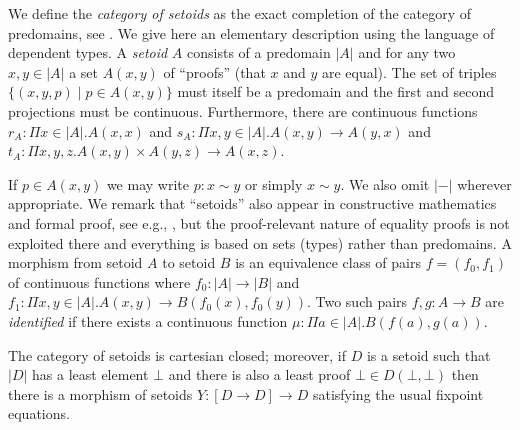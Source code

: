 \documentclass[orivec]{llncs}
\makeatletter
\newif\iffull\fullfalse
\renewcommand{\section}{\@startsection{section}{1}{\z@}{-10\p@ \@plus -4\p@ \@minus -4\p@}{5\p@ \@plus 4\p@ \@minus 4\p@}{\normalfont\bfseries\boldmath\rightskip=\z@ \@plus 8em\pretolerance=10000 }}
\makeatother
\begin{document}
\section{Setoids}
\label{sec:setoids}
We define the \emph{category of setoids} as the exact completion of
the category of predomains, see
\cite{DBLP:conf/mfps/CarboniFS87,DBLP:conf/lics/BirkedalCRS98}. We
give here an elementary description using the language of dependent
types.  A \emph{setoid} $A$ consists of a predomain $|A|$ and for any
two $x,y\in |A|$ a set $A(x,y)$ of ``proofs'' (that $x$ and $y$ are
equal). The set of triples $\{(x,y,p) \mid p\in A(x,y)\}$ must itself
be a predomain and the first and second projections must be
continuous. Furthermore, there are continuous functions $r_A:\Pi x\in
|A|.A(x,x)$ and $s_A:\Pi x,y\in |A|.A(x,y)\rightarrow A(y,x)$ and
$t_A:\Pi x,y,z.A(x,y)\times A(y,z)\rightarrow A(x,z)$.
\iffull
We should explain what continuity of a dependent function like
$t(-,-)$ is: if $(x_i)_i$ and $(y_i)_i$ and $(z_i)_i$ are ascending
chains in $A$ with suprema $x,y,z$ and $p_i\in A(x_i,y_i)$ and $q_i\in
A(y_i,z_i)$ are proofs such that $(x_i,y_i,p_i)_i$ and $(y_i,z_i,q_i)_i$
are ascending chains, too, with suprema $(x,y,p)$ and $(y,z,q)$ then
$(x_i,z_i,t(p_i,q_i))$ is an ascending chain of proofs (by
monotonicity of $t(-,-)$) and its supremum is $(x,z,t(p,q))$.
\fi
\iffull
 Formally,
such dependent functions can be reduced to non-dependent ones using
pullbacks, that is $t$ would be a function defined on the pullback of
the second and first projections from $\{(x,y,p)\mid p\in A(x,y)\}$ to
$|A|$, but we find the dependent notation to be much more readable.
\fi
If $p\in A(x,y)$ we may write $p:x\sim y$ or simply $x\sim y$. We also
omit $|-|$ wherever appropriate. We remark that ``setoids'' also appear in
constructive mathematics and formal proof, see e.g.,
\cite{DBLP:journals/jfp/BartheCP03}, but the proof-relevant nature of
equality proofs is not exploited there and everything is based on sets
(types) rather than predomains. 
A morphism from setoid $A$ to setoid $B$ is an equivalence class of  pairs $f=(f_0,f_1)$ of
continuous functions where $f_0:|A|\rightarrow |B|$ and $f_1:\Pi
x,y\in|A|.A(x,y)\rightarrow B(f_0(x),f_0(y))$. Two such pairs
$f,g:A\rightarrow B$ are \emph{identified} if there exists a
continuous function $\mu:\Pi a\in|A|.B(f(a),g(a))$. 
\begin{proposition}
The category of setoids is cartesian closed; moreover, if $D$ is a setoid such that $|D|$ has a least element $\bot$ and there is also a least proof $\bot\in D(\bot,\bot)$ then there is a morphism of setoids $Y:[D\rightarrow D]\rightarrow D$ satisfying the usual fixpoint equations. 
\end{proposition}
\end{document}
